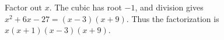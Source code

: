 Factor out $x$. The cubic has root $-1$, and division gives $x^2+6x-27=(x-3)(x+9)$. Thus the factorization is $\boxed{x(x+1)(x-3)(x+9)}$.
